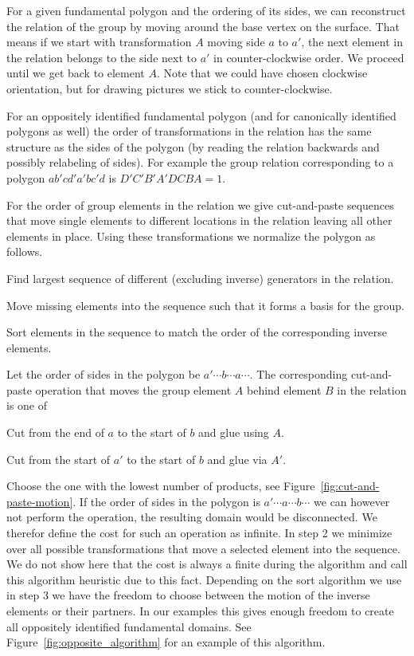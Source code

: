 \documentclass[Thesis]{subfiles}
\begin{document}
 For a given fundamental polygon and the ordering of its sides, we can reconstruct the relation of the group by moving around the base vertex on the surface. That means if we start with transformation $A$ moving side $a$ to $a'$, the next element in the relation belongs to the side next to $a'$ in counter-clockwise order. We proceed until we get back to element $A$. Note that we could have chosen clockwise orientation, but for drawing pictures we stick to counter-clockwise.

 For an oppositely identified fundamental polygon (and for canonically identified polygons as well) the order of transformations in the relation has the same structure as the sides of the polygon (by reading the relation backwards and possibly relabeling of sides). For example the group relation corresponding to a polygon $ab'cd'a'bc'd$ is $D'C'B'A'DCBA=1$.

 For the order of group elements in the relation we give cut-and-paste sequences that move single elements to different locations in the relation leaving all other elements in place. Using these transformations we normalize the polygon as follows.

 \begin{compactenum}[(1)]
 \item Find largest sequence of different (excluding inverse) generators in the relation.
 \item Move missing elements into the sequence such that it forms a basis for the group.
 \item Sort elements in the sequence to match the order of the corresponding inverse elements.
 \end{compactenum}

 Let the order of sides in the polygon be $a' \cdots b \cdots a \cdots$. The corresponding cut-and-paste operation that moves the group element $A$ behind element $B$ in the relation is one of

 \begin{compactitem}[$\bullet$]
 \item Cut from the end of $a$ to the start of $b$ and glue using $A$.
 \item Cut from the start of $a'$ to the start of $b$ and glue via $A'$.
 \end{compactitem}

 Choose the one with the lowest number of products, see Figure~\ref{fig:cut-and-paste-motion}. If the order of sides in the polygon is $a' \cdots a \cdots b \cdots$ we can however not perform the operation, the resulting domain would be disconnected. We therefor define the cost for such an operation as infinite. In step 2 we minimize over all possible transformations that move a selected element into the sequence. We do not show here that the cost is always a finite during the algorithm and call this algorithm heuristic due to this fact. Depending on the sort algorithm we use in step 3 we have the freedom to choose between the motion of the inverse elements or their partners. In our examples this gives enough freedom to create all oppositely identified fundamental domains. See Figure~\ref{fig:opposite_algorithm} for an example of this algorithm.
\end{document}
